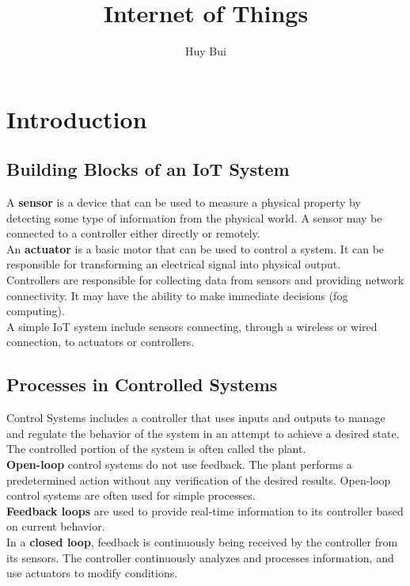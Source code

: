 \documentclass[10pt,a4paper]{article}
\author{Huy Bui}
\title{Internet of Things}
\begin{document}
\section{Introduction}

\subsection{Building Blocks of an IoT System}

A \textbf{sensor} is a device that can be used to measure a physical property by detecting some type of information from the physical world. A sensor may be connected to a controller either directly or remotely.\\

An \textbf{actuator} is a basic motor that can be used to control a system. It can be responsible for transforming an electrical signal into physical output.\\

Controllers are responsible for collecting data from sensors and providing network connectivity. It may have the ability to make immediate decisions (fog computing).\\

A simple IoT system include sensors connecting, through a wireless or wired connection, to actuators or controllers.

\subsection{Processes in Controlled Systems}

Control Systems includes a controller that uses inputs and outputs to manage and regulate the behavior of the system in an attempt to achieve a desired state. The controlled portion of the system is often called the plant.\\

\textbf{Open-loop} control systems do not use feedback. The plant performs a predetermined action without any verification of the desired results. Open-loop control systems are often used for simple processes.\\

\textbf{Feedback loops} are used to provide real-time information to its controller based on current behavior. \\

In a \textbf{closed loop}, feedback is continuously being received by the controller from its sensors. The controller continuously analyzes and processes information, and use actuators to modify conditions.\\
\end{document}
